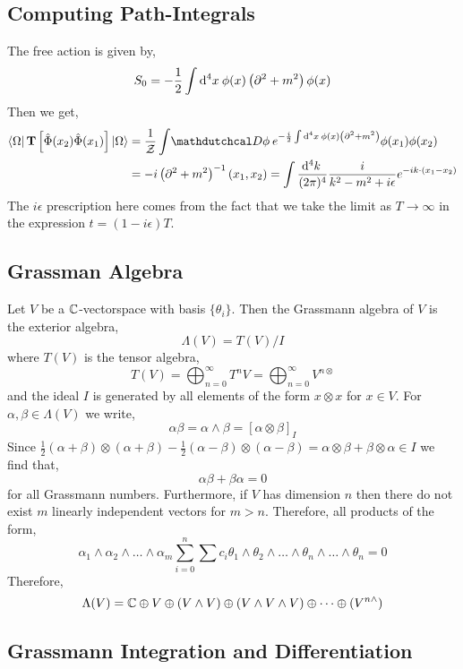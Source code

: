 \documentclass[12pt]{extarticle}
\begin{document}
\subsection{Computing Path-Integrals}

The free action is given by,
\[ S_0 = -\frac{1}{2} \int \mathrm{d}^{4} x \: \phi(x) \left( \partial^2 + m^2 \right) \phi(x) \]
Then we get,
\begin{align*}
\bra{\Omega} \mathbf{T} \left[ \field(x_2) \field(x_1) \right] \ket{\Omega} & = \frac{1}{ \Znorm } \int \pathd{\phi} e^{-\frac{i}{2}  \int \dn{4}{x} \phi(x) \left( \partial^2 + m^2 \right) } \phi(x_1) \phi(x_2)
\\
& = -i \left( \partial^2 + m^2 \right)^{-1}(x_1, x_2) = \int \frac{\dn{4}{k}}{(2 \pi)^4} \frac{i}{k^2 - m^2 + i \epsilon} e^{- ik \cdot (x_1 - x_2) } 
\end{align*}
The $i \epsilon$ prescription here comes from the fact that we take the limit as $T \to \infty$ in the expression $t = (1 - i\epsilon) T$.

\subsection{Grassman Algebra}

Let $V$ be a $\mathbb{C}$-vectorspace with basis $\{\theta_i\}$. Then the Grassmann algebra of $V$ is the exterior algebra,
\[ \Lambda(V) = T(V) / I \]
where $T(V)$ is the tensor algebra,
\[ T(V) = \bigoplus_{n = 0}^{\infty} T^nV = \bigoplus_{n = 0}^\infty V^{n \otimes} \]
and the ideal $I$ is generated by all elements of the form $x \otimes x$ for $x \in V$. For $\alpha, \beta \in \Lambda(V)$ we write,
\[ \alpha \beta = \alpha \wedge \beta = [\alpha \otimes \beta]_I \]
Since $\tfrac{1}{2} (\alpha + \beta) \otimes (\alpha + \beta) - \tfrac{1}{2} (\alpha - \beta) \otimes (\alpha - \beta) =  \alpha \otimes \beta + \beta \otimes \alpha \in I$ we find that,
\[ \alpha \beta + \beta \alpha = 0\]
for all Grassmann numbers. Furthermore, if $V$ has dimension $n$ then there do not exist $m$ linearly independent vectors for $m > n$. Therefore, all products of the form,
\[ \alpha_1 \wedge \alpha_2 \wedge \dots \wedge \alpha_m \sum_{i = 0}^n \sum c_{i} \theta_1 \wedge \theta_2 \wedge \dots \wedge \theta_n \wedge \dots \wedge \theta_n = 0\]
Therefore,
\[ \Lambda(V) = \mathbb{C} \oplus V \oplus (V \wedge V) \oplus (V \wedge V \wedge V) \oplus \dots \oplus (V^{n\wedge}) \]

\subsection{Grassmann Integration and Differentiation}
\end{document}
